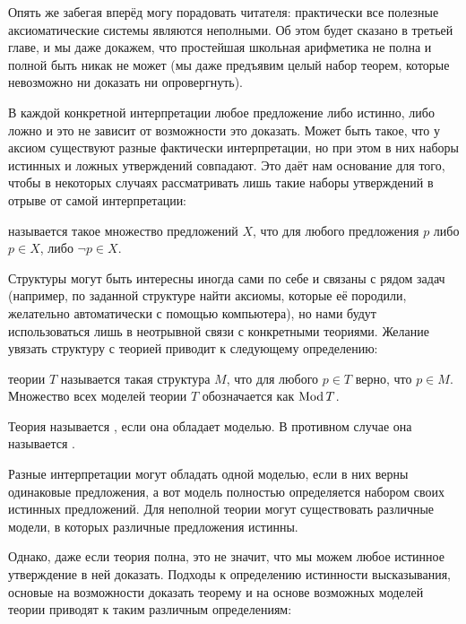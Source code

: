 Опять же забегая вперёд могу порадовать читателя: практически все полезные аксиоматические системы являются неполными. Об этом будет сказано в третьей главе, и мы даже докажем, что простейшая школьная арифметика не полна и полной быть никак не может (мы даже предъявим целый набор теорем, которые невозможно ни доказать ни опровергнуть).

В каждой конкретной интерпретации любое предложение либо истинно, либо ложно и это не зависит от возможности это доказать. Может быть такое, что у аксиом существуют разные фактически интерпретации, но при этом в них наборы истинных и ложных утверждений совпадают. Это даёт нам основание для того, чтобы в некоторых случаях рассматривать лишь такие наборы утверждений в отрыве от самой интерпретации:

\begin{definition}
 называется такое множество предложений $X$, что для любого предложения $p$ либо $p\in X$, либо $\neg p \in X$.
\end{definition}

Структуры могут быть интересны иногда сами по себе и связаны с рядом задач (например, по заданной структуре найти аксиомы, которые её породили, желательно автоматически с помощью компьютера), но нами будут использоваться лишь в неотрывной связи с конкретными теориями. Желание увязать структуру с теорией приводит к следующему определению:

\begin{definition}
 теории $T$ называется такая структура $M$, что для любого $p\in T$ верно, что $p\in M$. Множество всех моделей теории $T$ обозначается как $\operatorname{Mod} T$.
\end{definition}

\begin{definition}
Теория называется , если она обладает моделью. В противном случае она называется .
\end{definition}

Разные интерпретации могут обладать одной моделью, если в них верны одинаковые предложения, а вот модель полностью определяется набором своих истинных предложений. Для неполной теории могут существовать различные модели, в которых различные предложения истинны.

Однако, даже если теория полна, это не значит, что мы можем любое истинное утверждение в ней доказать. Подходы к определению истинности высказывания, основые на возможности доказать теорему и на основе возможных моделей теории приводят к таким различным определениям:

